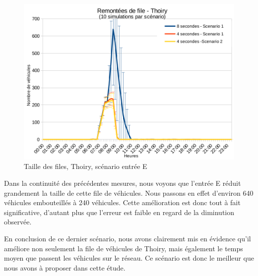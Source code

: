 \documentclass[a4paper,11pt, titlepage]{extarticle}
\begin{document}
\begin{figure}[!h]
  \begin{center}
    \includegraphics[width=13cm]{graphiques/leakyB_entreeE.png}
  \end{center}
  \vspace{-0.8cm}
  \caption{Taille des files, Thoiry, scénario entrée E}
  \label{graphLBThoirySE}
\end{figure}

Dans la continuité des précédentes mesures, nous voyons que l'entrée E réduit grandement la taille de cette file de véhicules. Nous passons en effet d'environ 640 véhicules embouteillés à 240 véhicules. Cette amélioration est donc tout à fait significative, d'autant plus que l'erreur est faible en regard de la diminution observée.

\vspace{0.4cm}

En conclusion de ce dernier scénario, nous avons clairement mis en évidence qu'il améliore non seulement la file de véhicules de Thoiry, mais également le temps moyen que passent les véhicules sur le réseau. Ce scénario est donc le meilleur que nous avons à proposer dans cette étude.
\end{document}
